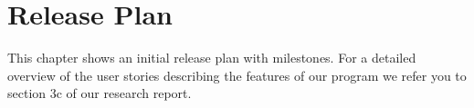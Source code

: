 \section{Release Plan}

This chapter shows an initial release plan with milestones. For a detailed overview of the user stories describing the features of our program we refer you to section 3c of our research report. 

\iffalse


